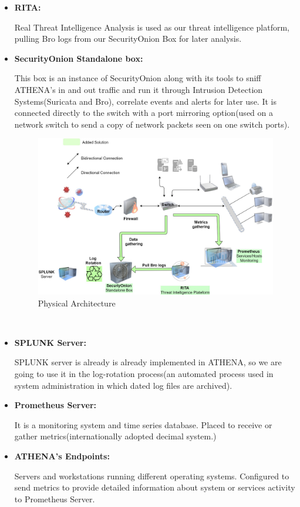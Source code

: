 \begin{itemize}
    \item \textbf{RITA:}
    
    Real Threat Intelligence Analysis is used as our threat intelligence platform, pulling Bro logs from our SecurityOnion Box for later analysis.
    \item\textbf{SecurityOnion Standalone box:} 
    
    This box is an instance of SecurityOnion along with its tools to sniff ATHENA's in and out traffic and run it through Intrusion Detection Systems(Suricata and Bro), correlate events and alerts for later use. It is connected directly to the switch with a port mirroring option(used on a network switch to send a copy of network packets seen on one switch ports).
    \begin{figure}[!htpb] 
    \begin{center}
    \includegraphics[width=6.3 in]{images/ATHENANewNetworkarch.jpg}
    \caption{Physical Architecture}
    \label{physic_arch}
    \end{center}
    \end{figure}~
    \item\textbf{SPLUNK Server:}
    
    SPLUNK server is already is already implemented in ATHENA, so we are going to use it in the log-rotation process(an automated process used in system administration in which dated log files are archived).
    \item \textbf{Prometheus Server:}
    
    It is a monitoring system and time series database. Placed to receive or gather metrics(internationally adopted decimal system.)
    \item \textbf{ATHENA's Endpoints:}
    
    Servers and workstations running different operating systems. Configured to send metrics to provide detailed information about system or services activity to Prometheus Server.
\end{itemize}




